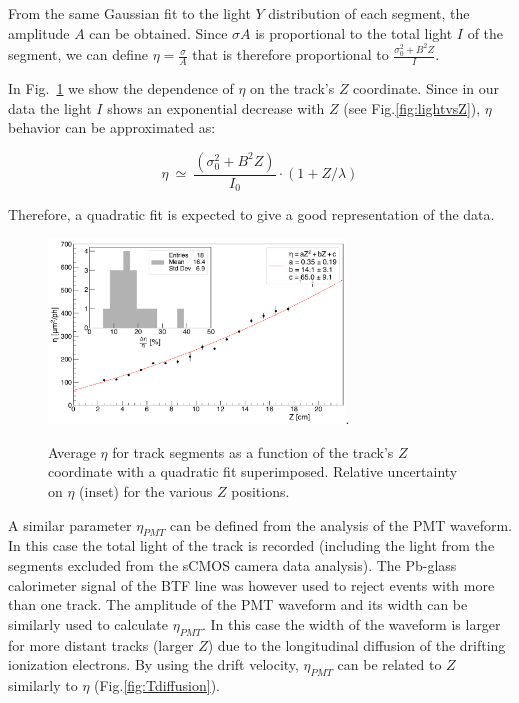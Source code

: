 \documentclass[review]{elsarticle}
\begin{document}
From the same Gaussian fit to the light  $Y$ distribution of each segment, the amplitude $A$ can be obtained. Since $\sigma A$ is proportional to the total light $I$ of the segment, we can  define $\eta = \frac{\sigma}{A}$ that is therefore  proportional to $\frac{\sigma_0^2 + B^2 Z}{I}$.

In Fig.~\ref{fig:etavsZ} we show the dependence of $\eta$ 
on the track's $Z$ coordinate. Since in our data   the light $I$ shows an exponential decrease with $Z$ (see Fig.\ref{fig:lightvsZ}), $\eta$ behavior can be approximated as:

\begin{equation}
\eta~\simeq~\frac{(\sigma_0^2 + B^2 Z)}{I_0} \cdot (1+ Z/\lambda)
\end{equation}

Therefore, a quadratic fit is expected to give a good representation of the data.
 
\begin{figure}[ht]
\centering
\includegraphics[width=3.1in]{Fig9-eta-CMOS-Z.pdf}\DeclareGraphicsExtensions.
\caption{ Average $\eta$ for track segments as a function of the track's $Z$ coordinate with a quadratic fit superimposed. Relative uncertainty on $\eta$ (inset) for the various $Z$ positions. }
\label{fig:etavsZ}
\end{figure}

A similar parameter $\eta_{PMT}$ can be defined from the analysis of the PMT waveform. In this case the total light of the track is recorded (including the light from the segments excluded from the sCMOS camera data analysis).  The Pb-glass calorimeter signal of the BTF line was however used to reject  events with  more than one  track. 
The amplitude of the  PMT waveform and its width can be similarly  used to calculate $\eta_{PMT}$. In this case the width of the waveform is larger for more distant tracks (larger $Z$)  due to the longitudinal diffusion of the drifting ionization electrons. By using the drift velocity, $\eta_{PMT}$ can be related to $Z$ similarly to $\eta$ (Fig.\ref{fig:Tdiffusion}). 
\end{document}
